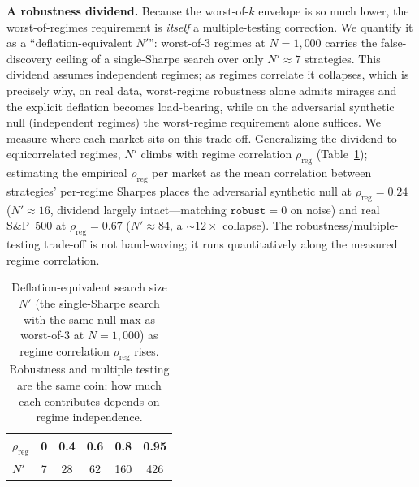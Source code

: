 \documentclass[sigconf]{acmart}
\begin{document}
\textbf{A robustness dividend.} Because the worst-of-$k$ envelope is so much lower, the worst-of-regimes requirement is \emph{itself} a multiple-testing correction. We quantify it as a ``deflation-equivalent $N'$'': worst-of-3 regimes at $N{=}1{,}000$ carries the false-discovery ceiling of a single-Sharpe search over only $N'{\approx}7$ strategies. This dividend assumes independent regimes; as regimes correlate it collapses, which is precisely why, on real data, worst-regime robustness alone admits mirages and the explicit deflation becomes load-bearing, while on the adversarial synthetic null (independent regimes) the worst-regime requirement alone suffices. We measure where each market sits on this trade-off. Generalizing the dividend to equicorrelated regimes, $N'$ climbs with regime correlation $\rho_{\text{reg}}$ (Table~\ref{tab:regime}); estimating the empirical $\rho_{\text{reg}}$ per market as the mean correlation between strategies' per-regime Sharpes places the adversarial synthetic null at $\rho_{\text{reg}}{=}0.24$ ($N'{\approx}16$, dividend largely intact---matching $\texttt{robust}{=}0$ on noise) and real S\&P~500 at $\rho_{\text{reg}}{=}0.67$ ($N'{\approx}84$, a ${\sim}12\times$ collapse). The robustness/multiple-testing trade-off is not hand-waving; it runs quantitatively along the measured regime correlation.

\begin{table}[t]
\caption{Deflation-equivalent search size $N'$ (the single-Sharpe search with the same null-max as worst-of-3 at $N{=}1{,}000$) as regime correlation $\rho_{\text{reg}}$ rises. Robustness and multiple testing are the same coin; how much each contributes depends on regime independence.}
\label{tab:regime}
\small
\begin{tabular}{@{}lccccc@{}}
\toprule
$\rho_{\text{reg}}$ & 0 & 0.4 & 0.6 & 0.8 & 0.95 \\
\midrule
$N'$ & 7 & 28 & 62 & 160 & 426 \\
\bottomrule
\end{tabular}
\end{table}
\end{document}
